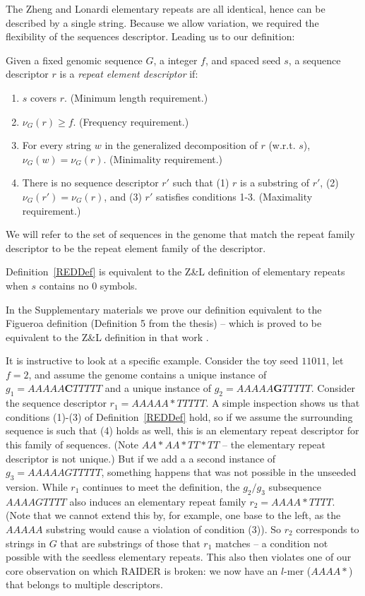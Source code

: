 \documentclass{bmcart}
\begin{document}
The Zheng and Lonardi elementary repeats are all identical, hence can
be described by a single string.  Because we allow variation, we
required the flexibility of the sequences descriptor.  Leading us to
our definition:

\begin{definition}
  \label{REDDef}
  Given a fixed genomic sequence $G$, a integer $f$, and spaced seed $s$, a sequence
  descriptor $r$ is a {\it repeat element descriptor} if:
  \begin{enumerate}
  \item $s$ covers $r$.  (Minimum length requirement.)
  \item $\nu_G(r) \geq f$.  (Frequency requirement.)
  \item For every string $w$ in the generalized decomposition of $r$
    (w.r.t. $s$), $\nu_G(w) = \nu_G(r)$.  (Minimality requirement.)
  \item There is no sequence descriptor $r'$ such that (1) $r$ is
    a substring of $r'$, (2) $\nu_G(r') = \nu_G(r)$, and (3) $r'$
    satisfies conditions 1-3.  (Maximality requirement.)
  \end{enumerate}
\end{definition}

We will refer to the set of sequences in the genome that match the
repeat family descriptor to be the repeat element family of the
descriptor.

\begin{theorem}
Definition~\ref{REDDef} is equivalent to the Z\&L
definition of elementary repeats when $s$ contains no 0 symbols.
\end{theorem}
In the Supplementary materials we prove our definition equivalent to
the Figueroa definition (Definition 5 from the thesis) -- which is
proved to be equivalent to the Z\&L definition in that work \cite{Figueroa:2014uk}.

It is instructive to look at a specific example.  Consider the toy
seed $11011$, let $f=2$, and assume the genome contains a unique
instance of $g_1 = AAAAA{\mathbf C}TTTTT$ and a unique instance of
$g_2 = AAAAA{\mathbf G}TTTTT$.  Consider the sequence descriptor $r_1
= AAAAA*TTTTT$.  A simple inspection shows us that conditions (1)-(3)
of Definition~\ref{REDDef} hold, so if we assume the surrounding
sequence is such that (4) holds as well, this is an elementary repeat
descriptor for this family of sequences.  (Note $AA*AA*TT*TT$ -- the
elementary repeat descriptor is not unique.)  But if we add a a second
instance of $g_3 = AAAAAGTTTTT$, something happens that was not
possible in the unseeded version.  While $r_1$ continues to meet the definition, the $g_2/g_3$
subsequence $AAAAGTTTT$ also induces an elementary repeat family
$r_2 = AAAA*TTTT$. (Note that we cannot extend this by, for example,
one base to the left, as the $AAAAA$ substring would cause a violation
of condition (3)).  So $r_2$ corresponds to strings in $G$ that are
substrings of those that $r_1$ matches -- a condition not possible
with the seedless elementary repeats.  This also then violates one of
our core observation on which RAIDER is broken: we now have an $l$-mer
($AAAA*$) that belongs to multiple descriptors.
\end{document}
